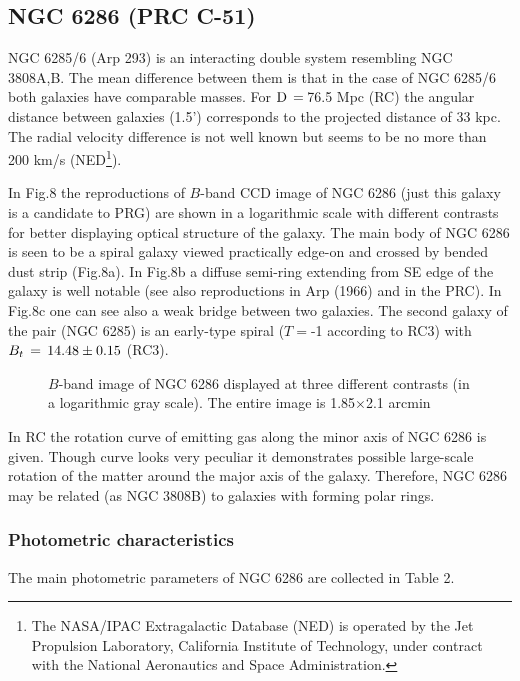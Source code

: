 \subsection{NGC 6286 (PRC C-51)}

NGC 6285/6 (Arp 293) is an interacting double system resembling
NGC 3808A,B. The mean difference between them is that in the
case of NGC 6285/6 both galaxies have comparable masses.
For $\rm D\,=\,$76.5 Mpc (RC) the angular distance between galaxies
(1.5') corresponds to the projected distance of 33 kpc.
The radial
velocity difference is not well known but seems to be no more
than 200 km/s (NED\footnote{The NASA/IPAC Extragalactic Database (NED)
is operated by the Jet Propulsion Laboratory, California Institute of
Technology, under contract with the National Aeronautics and Space
Administration.}). 

In Fig.8 the reproductions of $B$-band
CCD image of NGC 6286 (just this galaxy is a candidate to PRG)
are shown in a logarithmic scale with different contrasts for
better displaying optical structure of the galaxy.
The main body of NGC 6286 is seen to be a spiral galaxy viewed
practically edge-on and crossed by bended dust strip (Fig.8a).
In Fig.8b a diffuse semi-ring extending from SE edge of the
galaxy is well notable (see also reproductions in Arp (1966) and
in the PRC). In Fig.8c one can see also a weak bridge between
two galaxies. The second galaxy of the pair (NGC 6285) is an
early-type spiral ($T=$-1 according to RC3) with
$B_{t}\,=\rm\,14.48\pm0.15$ (RC3). 

\begin{figure}
\picplace{1.5cm}
\caption[8]{$B$-band image of NGC 6286 displayed at three different
contrasts (in a logarithmic gray scale). The entire image is 
1.85$\times$2.1 arcmin}
\end{figure}

In RC the rotation curve of emitting gas along the minor axis
of NGC 6286 is given. Though curve looks very peculiar
it demonstrates possible large-scale
rotation of the matter around the major axis of the galaxy. Therefore,
NGC 6286 may be related (as NGC 3808B) to galaxies with forming
polar rings.

\subsubsection{Photometric characteristics}

The main photometric parameters of NGC 6286 are collected in
Table 2. 

